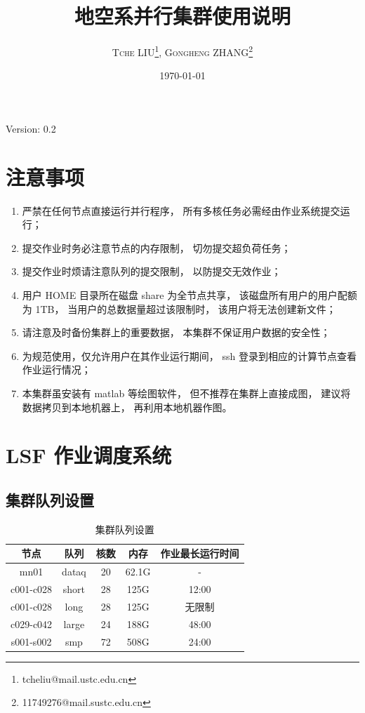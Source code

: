 \documentclass[UTF8]{ctexart}
\title{\vspace{10mm}\heiti\huge 地空系并行集群使用说明\vspace{30mm}}
\author{\LARGE\textsc{Tche LIU}\thanks{tcheliu@mail.ustc.edu.cn},
\textsc{Gongheng ZHANG}\thanks{11749276@mail.sustc.edu.cn}
\vspace{10mm}}
\date{\today}
\begin{document}
\maketitle
\centerline{Version: 0.2}
\newpage
\tableofcontents
\newpage

\section{注意事项}
\begin{enumerate}[\hspace{15mm}（1）]
  \item 严禁在任何节点直接运行并行程序，
    所有多核任务必需经由作业系统提交运行；
  \item 提交作业时务必注意节点的内存限制，
    切勿提交超负荷任务；
  \item 提交作业时烦请注意队列的提交限制，
    以防提交无效作业；
  \item 用户 HOME 目录所在磁盘 share 为全节点共享，
    该磁盘所有用户的用户配额为 1TB，
    当用户的总数据量超过该限制时，
    该用户将无法创建新文件；
  \item 请注意及时备份集群上的重要数据，
    本集群不保证用户数据的安全性；
  \item 为规范使用，仅允许用户在其作业运行期间，
    ssh 登录到相应的计算节点查看作业运行情况；
  \item 本集群虽安装有 matlab 等绘图软件，
    但不推荐在集群上直接成图，
    建议将数据拷贝到本地机器上，
    再利用本地机器作图。
\end{enumerate}

\section{LSF 作业调度系统}
\subsection{集群队列设置}
\begin{table}[h]
  \centering
  \caption{集群队列设置}
  \begin{tabular*}{300pt}{@{\extracolsep{\fill}}ccccc}
    \toprule
    节点      & 队列  & 核数 & 内存  & 作业最长运行时间 \\
    \midrule
    mn01      & dataq & 20   & 62.1G & -                \\
    c001-c028 & short & 28   & 125G  & 12:00            \\
    c001-c028 & long  & 28   & 125G  & 无限制           \\
    c029-c042 & large & 24   & 188G  & 48:00            \\
    s001-s002 & smp   & 72   & 508G  & 24:00            \\
    \bottomrule
  \end{tabular*}
\end{table}
\end{document}
